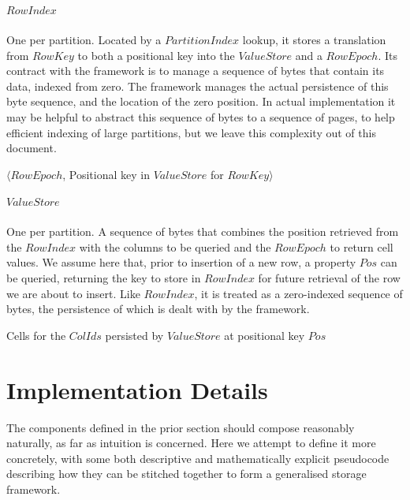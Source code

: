 \documentclass[fleqn]{article}
\begin{document}
\clearpage
\subparagraph{$RowIndex$}
\subparagraph{}
    One per partition. Located by a $PartitionIndex$ lookup, it stores a translation from $RowKey$ to 
    both a positional key into the $ValueStore$ and a $RowEpoch$. Its contract with the framework is to manage 
    a sequence of bytes that contain its data, indexed from zero. The framework manages the actual persistence 
    of this byte sequence, and the location of the zero position. In actual implementation it may be helpful 
    to abstract this sequence of bytes to a sequence of pages, to help efficient indexing of large partitions, 
    but we leave this complexity out of this document.
    \\
    \begin{algorithmic}[2]
    \scriptsize
    \Statex \Return $\langle RowEpoch$, Positional key in $ValueStore$ for $RowKey\rangle$
    \EndFunction
    \end{algorithmic}

\subparagraph{$ValueStore$}
\subparagraph{}
    One per partition. A sequence of bytes that combines the position retrieved from the $RowIndex$ with the 
    columns to be queried and the $RowEpoch$ to return cell values. We assume here that, prior to insertion of 
    a new row, a property $Pos$ can be queried, returning the key to store in $RowIndex$ 
    for future retrieval of the row we are about to insert.
    Like $RowIndex$, it is treated as a zero-indexed sequence of bytes, the persistence of which is dealt 
    with by the framework.
    \\
    \begin{algorithmic}[2]
    \scriptsize
    \Statex \Return Cells for the $ColIds$ persisted by $ValueStore$ at positional key $Pos$
    \EndFunction
    \end{algorithmic}

\paragraph{}
\section{Implementation Details}
\small
The components defined in the prior section should compose reasonably naturally, as far as intuition
is concerned. Here we attempt to define it more concretely, with some both descriptive and mathematically
explicit pseudocode describing how they can be stitched together to form a generalised storage framework.
\\
\end{document}
